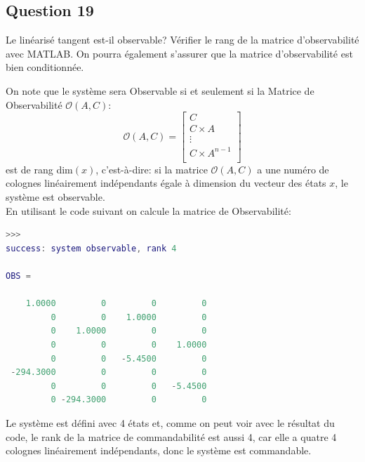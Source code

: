 \documentclass[class=article, crop=false]{standalone}
\begin{document}
\subsection{Question 19}
\begin{exercise}
    Le linéarisé tangent est-il observable? Vérifier le rang de la matrice d'observabilité avec MATLAB. On pourra également s'assurer que la matrice d'observabilité est bien conditionnée.
\end{exercise}
\begin{resolution}
    On note que le système sera Observable si et seulement si la Matrice de Observabilité $\mathcal{O}(A, C)$:
    \begin{equation}
        \boxed{
            \mathcal{O}(A, C) =
            \begin{bmatrix}
                C\\
                C\times A\\
                \vdots\\
                C\times A^{n-1}\\
            \end{bmatrix}
        }
    \end{equation}
    est de rang dim$(x)$, c'est-à-dire: si la matrice $\mathcal{O}(A, C)$ a une numéro de colognes linéairement indépendants égale à dimension du vecteur des états $x$, le système est observable.\\

    En utilisant le code suivant on calcule la matrice de Observabilité:
    \begin{scriptsize}\mycode
        
    \end{scriptsize}
    \begin{scriptsize}\mycode
        \begin{lstlisting}[language=Matlab]
>>>
success: system observable, rank 4

OBS =

    1.0000         0         0         0
         0         0    1.0000         0
         0    1.0000         0         0
         0         0         0    1.0000
         0         0   -5.4500         0
 -294.3000         0         0         0
         0         0         0   -5.4500
         0 -294.3000         0         0
        \end{lstlisting}
    \end{scriptsize}
    Le système est défini avec 4 états et, comme on peut voir avec le résultat du code, le rank de la matrice de commandabilité est aussi 4, car elle a quatre 4 colognes linéairement indépendants, donc le système est commandable.
\end{resolution}
\end{document}
